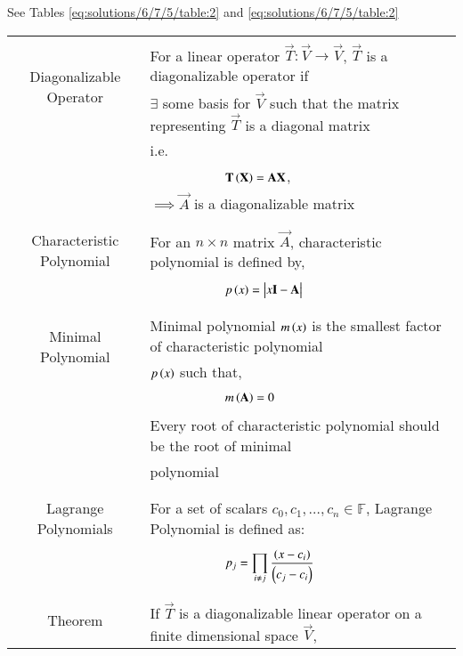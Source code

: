 See Tables     \ref{eq:solutions/6/7/5/table:2}
and     \ref{eq:solutions/6/7/5/table:2}
 
\onecolumn
\begin{longtable}{|c|l|}
    \hline
    \multirow{3}{*}{Diagonalizable Operator} 
	& \\
	& For a linear operator $\vec{T}\colon \vec{V}\longrightarrow \vec{V}$, $\vec{T}$ is a diagonalizable operator if \\
	& $\exists$ some basis for $\Vec{V}$ such that the matrix representing $\vec{T}$ is a diagonal matrix\\
	&i.e.\\
	& $\qquad\qquad\qquad \vec{T}\brak{\vec{X}}=\Vec{A}\Vec{X}$,\\
    &$\implies \vec{A}$ is a diagonalizable matrix\\
	&\\
	\hline
	\multirow{3}{*}{Characteristic Polynomial} 
	& \\
	& For an $n\times n$ matrix $\vec{A}$, characteristic polynomial is defined by,\\
	&\\
	& $\qquad\qquad\qquad p\brak{x}=\mydet{x\Vec{I}-\Vec{A}}$\\
	&\\
	\hline
	\multirow{3}{*}{Minimal Polynomial} 
	&\\
	& Minimal polynomial $m\left(x\right)$ is the smallest factor of characteristic polynomial\\
	& $p\left(x\right)$ such that,\\
	&\\
	& $\qquad \qquad \qquad m\left(\mathbf{A}\right)=0$\\
	& \\
	& Every root of characteristic polynomial should be the root of minimal\\
	& polynomial\\
	&\\
    \hline
	\multirow{3}{*}{Lagrange Polynomials} 
	& \\
	& For a set of scalars $c_0, c_1,\dots, c_n \in \mathbb{F}$, Lagrange Polynomial is defined as:\\
	&\\
	&$\qquad\qquad\qquad p_j=\displaystyle\prod_{i\neq j}\frac{\left(x-c_i\right)}{\left(c_j-c_i\right)}$\\
	&\\
	\hline
	\multirow{3}{*}{Theorem} 
	& \\
	& If $\vec{T}$ is a diagonalizable linear operator on a finite dimensional space $\vec{V}$,\\

\end{longtable}
